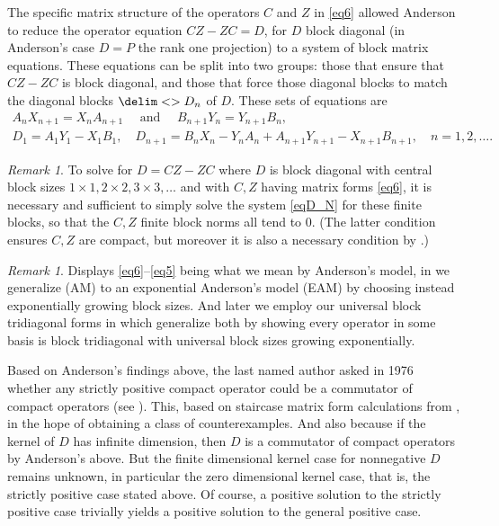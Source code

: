 \documentclass[10pt,reqno]{amsart}
\theoremstyle{remark}
\newtheorem{remark}[theorem]{Remark}
\newcommand{\seq}{\delim<>}
\numberwithin{equation}{section}
\begin{document}
The specific matrix structure of the operators $C$ and $Z$ in \eqref{eq6} allowed Anderson to reduce the operator equation $CZ-ZC=D$, for $D$ block diagonal (in Anderson's case $D = P$ the rank one projection) to a system of block matrix equations.
These equations can be split into two groups: those that ensure that $CZ-ZC$ is block diagonal, and those that force those diagonal blocks to match the diagonal blocks $\seq{D_n}$ of $D$.
These sets of equations are
\begin{equation}
  \label{eqD_N}
  \begin{gathered}
    A_nX_{n+1}=X_nA_{n+1}\quad\mbox{ and }\quad B_{n+1}Y_n=Y_{n+1}B_n,\\
    D_1=A_{1}Y_{1}-X_{1}B_{1}, \quad
    D_{n+1}=B_nX_n-Y_nA_n+A_{n+1}Y_{n+1}-X_{n+1}B_{n+1},\quad n=1,2,\dots.
  \end{gathered}
\end{equation}
\begin{remark}
  To solve for $D = CZ-ZC$ where $D$ is block diagonal with central block sizes $1\times 1, 2\times 2, 3\times 3, \dots$ and with $C,Z$ having matrix forms \eqref{eq6}, it is necessary and sufficient to simply solve  the system \eqref{eqD_N} for these finite blocks, so that the $C,Z$ finite block norms all tend to 0.
  (The latter condition ensures $C,Z$ are compact, but moreover it is also a necessary condition by .)
\end{remark}

\begin{remark}
  \label{r2.5}
  Displays \eqref{eq6}--\eqref{eq5} being what we mean by Anderson's model, in  we generalize (AM) to an exponential Anderson's model (EAM) by choosing instead exponentially growing block sizes.
  And later we employ our universal block tridiagonal forms in  which generalize both by showing every operator in some basis is block tridiagonal with universal block sizes growing exponentially.
\end{remark}

Based on Anderson's findings above, the last named author asked in 1976 whether any strictly positive compact operator could be a commutator of compact operators (see \cite[p.\,2, Acknowledgement and prior paragraph]{BPW-2014-VLOT}).
This, based on staircase matrix form calculations from \cite[Theorem 2 and lead up]{Wei-1980-IEOT}, in the hope of obtaining a class of counterexamples.
And also because if the kernel of $D$ has infinite dimension, then $D$ is a commutator of compact operators by Anderson's  above.
But the finite dimensional kernel case for nonnegative $D$ remains unknown, in particular the zero dimensional kernel case, that is, the strictly positive case stated above.
Of course, a positive solution to the strictly positive case trivially yields a positive solution to the general positive case.
\end{document}
